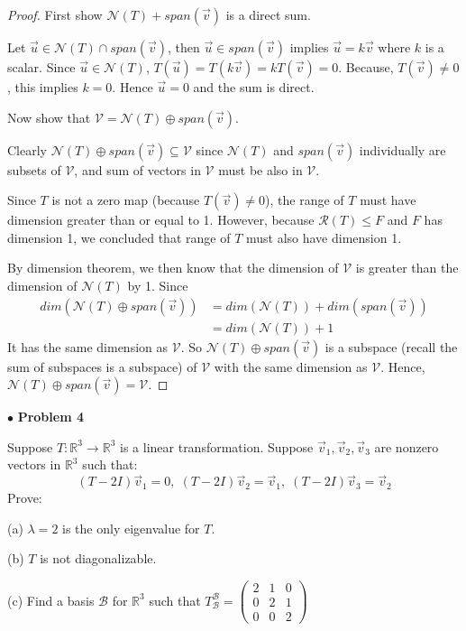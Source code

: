 \documentclass{article}
\begin{document}
\begin{proof}

 First show $ \mathcal{N}(T) +  span(\vec{v}) $ is a direct sum.
 \smallskip
 
 Let $\vec{u} \in  \mathcal{N}(T) \cap  span(\vec{v})$, then $\vec{u} \in span(\vec{v})$ implies $\vec{u} = k \vec{v}$ where $k$ is a scalar. Since $\vec{u} \in \mathcal{N}(T)$, $T(\vec{u}) = T(k \vec{v}) =kT(\vec{v})= 0$. Because, $T(\vec{v}) \ne 0$, this implies $k = 0$. Hence $\vec{u} = 0$ and the sum is direct.
\bigskip
 
 
Now show that $\mathcal{V} = \mathcal{N}(T) \oplus  span(\vec{v})$.
\smallskip

Clearly $\mathcal{N}(T) \oplus  span(\vec{v}) \subseteq \mathcal{V}$ since $\mathcal{N}(T)$ and $span(\vec{v})$ individually are subsets of $\mathcal{V}$, and sum of vectors in $\mathcal{V}$ must be also in $\mathcal{V}$.
\smallskip

Since $T$ is not a zero map (because $T(\vec{v}) \ne 0$), the range of $T$ must have dimension greater than or equal to 1. However, because $\mathcal{R}(T) \le F$ and $F$ has dimension 1, we concluded that range of $T$ must also have dimension 1.

By dimension theorem, we then know that the dimension of $\mathcal{V}$ is greater than the dimension of $\mathcal{N}(T)$ by 1. Since
\begin{align*}
dim (\mathcal{N}(T) \oplus span(\vec{v})) &= dim(\mathcal{N}(T)) + dim(span(\vec{v}))\\
& =dim(\mathcal{N}(T)) +1
\end{align*}
 It has the same dimension as $\mathcal{V}$. So $\mathcal{N}(T) \oplus span(\vec{v})$ is a subspace (recall the sum of subspaces is a subspace) of $\mathcal{V}$ with the same dimension as $\mathcal{V}$. Hence, $\mathcal{N}(T) \oplus span(\vec{v}) = \mathcal{V}$.

\end{proof}

\newpage
$ \bullet$ \textbf{Problem 4}
\medskip

\begin{itshape}
Suppose $T: \mathbb{R}^3 \to \mathbb{R}^3$ is a linear transformation. Suppose $\vec{v}_1, \vec{v}_2, \vec{v}_3$ are nonzero vectors in $\mathbb{R}^3$ such that:
$$(T-2I)\vec{v}_1 = 0, \; (T-2I)\vec{v}_2 = \vec{v}_1, \; (T-2I)\vec{v}_3 = \vec{v}_2$$
Prove:

(a) $\lambda =2$ is the only eigenvalue for $T$.
\medskip

(b) $T$ is not diagonalizable.
\medskip

(c) Find a basis $\mathcal{B}$ for $\mathbb{R}^3$ such that $T^\mathcal{B}_{\mathcal{B}} = \begin{pmatrix} 2 &1 & 0 \\0&2&1 \\0&0&2 \end{pmatrix}$
\end{itshape}
\medskip
\end{document}
